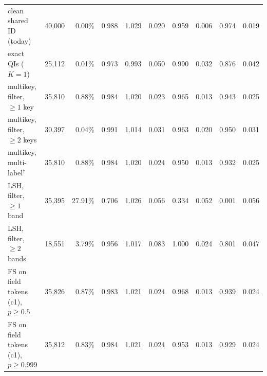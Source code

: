 \begin{table}[t]
{\begin{tabular}{@{}lrrrrrrrrr@{}}
clean shared ID (today) & 40{,}000 & 0.00\% & 0.988 & 1.029 & 0.020 & 0.959 & 0.006 & 0.974 & 0.019 \\
exact QIs ($K{=}1$) & 25{,}112 & 0.01\% & 0.973 & 0.993 & 0.050 & 0.990 & 0.032 & 0.876 & 0.042 \\
multikey, filter, $\ge1$ key & 35{,}810 & 0.88\% & 0.984 & 1.020 & 0.023 & 0.965 & 0.013 & 0.943 & 0.025 \\
multikey, filter, $\ge2$ keys & 30{,}397 & 0.04\% & 0.991 & 1.014 & 0.031 & 0.963 & 0.020 & 0.950 & 0.031 \\
multikey, multi-label$^\dagger$ & 35{,}810 & 0.88\% & 0.984 & 1.020 & 0.024 & 0.950 & 0.013 & 0.932 & 0.025 \\
LSH, filter, $\ge1$ band & 35{,}395 & 27.91\% & 0.706 & 1.026 & 0.056 & 0.334 & 0.052 & 0.001 & 0.056 \\
LSH, filter, $\ge2$ bands & 18{,}551 & 3.79\% & 0.956 & 1.017 & 0.083 & 1.000 & 0.024 & 0.801 & 0.047 \\
FS on field tokens (c1), $p\ge0.5$ & 35{,}826 & 0.87\% & 0.983 & 1.021 & 0.024 & 0.968 & 0.013 & 0.939 & 0.024 \\
FS on field tokens (c1), $p\ge0.999$ & 35{,}812 & 0.83\% & 0.984 & 1.021 & 0.024 & 0.953 & 0.013 & 0.929 & 0.024 \\
\bottomrule\end{tabular}}\end{table}
